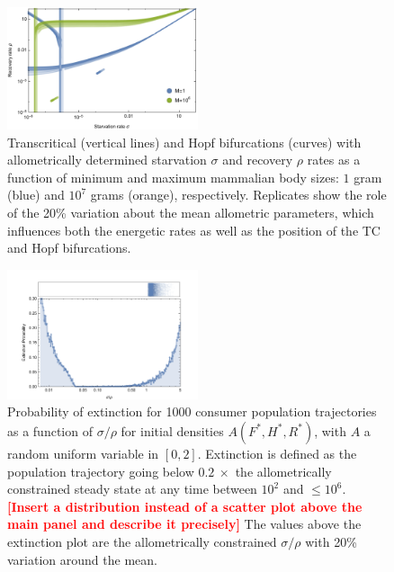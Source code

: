 \documentclass{pnastwo}
\newcommand{\sid}[1]{\textcolor{red}{\bf [#1]}}
\begin{document}
\begin{figure}
\centering
\includegraphics[width=0.5\textwidth]{fig_DataHopf.pdf}
\caption{ Transcritical (vertical lines) and Hopf bifurcations (curves) with
  allometrically determined starvation $\sigma$ and recovery $\rho$ rates as
  a function of minimum and maximum mammalian body sizes: $1$ gram (blue) and
  $10^7$ grams (orange), respectively.  Replicates show the role of the 20\%
  variation about the mean allometric parameters, which influences both the
  energetic rates as well as the position of the TC and Hopf bifurcations.  }
\label{fig:hopf}
\end{figure}

\begin{figure}
\centering
\includegraphics[width=0.5\textwidth]{fig_ExtinctionAllometric.pdf}
\caption{ Probability of extinction for 1000 consumer population trajectories
  as a function of $\sigma/\rho$ for initial densities $A(F^*,H^*,R^*)$, with
  $A$ a random uniform variable in $[0,2]$.  Extinction is defined as the
  population trajectory going below $0.2~\times$ the allometrically
  constrained steady state at any time between $10^2$ and $\leq 10^6$.
  \sid{Insert a distribution instead of a scatter plot above the main panel
    and describe it precisely} The values above the extinction plot are the
  allometrically constrained $\sigma/\rho$ with 20\% variation around the
  mean.  }
\label{fig:ext}
\end{figure} 
 
\end{document}
